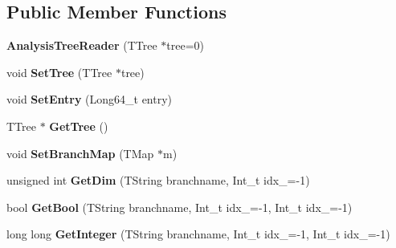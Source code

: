 \subsection*{Public Member Functions}
\begin{DoxyCompactItemize}
\item 
\hypertarget{class_h_a_l_1_1_analysis_tree_reader_ac00ba35d0b860566482e32c1dfd04827}{{\bfseries Analysis\-Tree\-Reader} (T\-Tree $\ast$tree=0)}\label{class_h_a_l_1_1_analysis_tree_reader_ac00ba35d0b860566482e32c1dfd04827}

\item 
\hypertarget{class_h_a_l_1_1_analysis_tree_reader_a031181c782d3620d271a92cef995d998}{void {\bfseries Set\-Tree} (T\-Tree $\ast$tree)}\label{class_h_a_l_1_1_analysis_tree_reader_a031181c782d3620d271a92cef995d998}

\item 
\hypertarget{class_h_a_l_1_1_analysis_tree_reader_a1a9c8bc30141df5fab1163f006fb08e3}{void {\bfseries Set\-Entry} (Long64\-\_\-t entry)}\label{class_h_a_l_1_1_analysis_tree_reader_a1a9c8bc30141df5fab1163f006fb08e3}

\item 
\hypertarget{class_h_a_l_1_1_analysis_tree_reader_a6ad8933bd6c8cc2b17179c96fd3bfcb1}{T\-Tree $\ast$ {\bfseries Get\-Tree} ()}\label{class_h_a_l_1_1_analysis_tree_reader_a6ad8933bd6c8cc2b17179c96fd3bfcb1}

\item 
\hypertarget{class_h_a_l_1_1_analysis_tree_reader_ae3dcc57b2cc27431e89edd341b300eb6}{void {\bfseries Set\-Branch\-Map} (T\-Map $\ast$m)}\label{class_h_a_l_1_1_analysis_tree_reader_ae3dcc57b2cc27431e89edd341b300eb6}

\item 
\hypertarget{class_h_a_l_1_1_analysis_tree_reader_aa59fc683b0244521072330bb1bf9d11b}{unsigned int {\bfseries Get\-Dim} (T\-String branchname, Int\-\_\-t idx\-\_=-\/1)}\label{class_h_a_l_1_1_analysis_tree_reader_aa59fc683b0244521072330bb1bf9d11b}

\item 
\hypertarget{class_h_a_l_1_1_analysis_tree_reader_abecfa073e05717b3f6bb7e622a356894}{bool {\bfseries Get\-Bool} (T\-String branchname, Int\-\_\-t idx\-\_=-\/1, Int\-\_\-t idx\-\_=-\/1)}\label{class_h_a_l_1_1_analysis_tree_reader_abecfa073e05717b3f6bb7e622a356894}

\item 
\hypertarget{class_h_a_l_1_1_analysis_tree_reader_aa274d2bc3ec30a0364b99517ec757fb1}{long long {\bfseries Get\-Integer} (T\-String branchname, Int\-\_\-t idx\-\_=-\/1, Int\-\_\-t idx\-\_=-\/1)}\label{class_h_a_l_1_1_analysis_tree_reader_aa274d2bc3ec30a0364b99517ec757fb1}


\end{DoxyCompactItemize}
